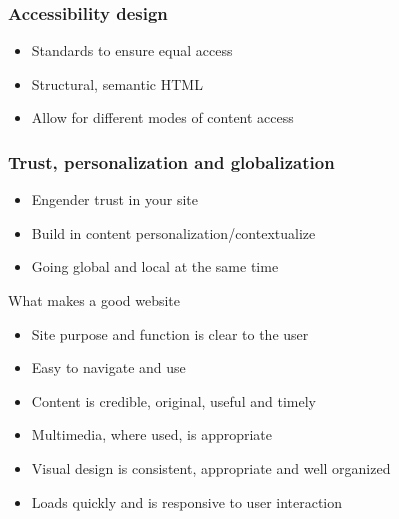 \subsubsection{Accessibility design}
\begin{itemize}
	\item Standards to ensure equal access
	\item Structural, semantic HTML
	\item Allow for different modes of content access
\end{itemize}
\subsubsection{Trust, personalization and globalization}
\begin{itemize}
	\item Engender trust in your site
	\item Build in content personalization/contextualize
	\item Going global and local at the same time
\end{itemize}

\begin{note}{What makes a good website}
	\begin{itemize}
		\item Site purpose and function is clear to the user
		\item Easy to navigate and use
		\item Content is credible, original, useful and timely
		\item Multimedia, where used, is appropriate
		\item Visual design is consistent, appropriate and well organized
		\item Loads quickly and is responsive to user interaction
	\end{itemize}
\end{note}